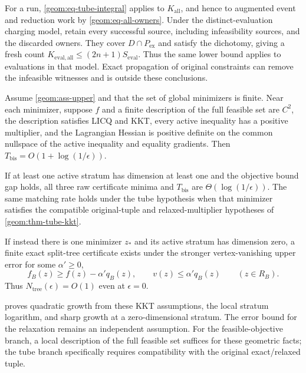 For a run, \cref{geom:eq-tube-integral} applies to $K_{\mathrm{all}}$,
and hence to augmented event and reduction work by
\cref{geom:eq-all-owners}. Under the distinct-evaluation charging model,
retain every successful source, including infeasibility sources, and
the discarded owners. They cover $D\cap P_{\mathrm{ex}}$ and satisfy
the dichotomy, giving a fresh count
$K_{\mathrm{eval,all}}\leq(2n+1)S_{\mathrm{eval}}$.
Thus the same lower bound applies to evaluations in that model.
Exact propagation of original constraints can remove the infeasible
witnesses and is outside these conclusions.

\begin{corollary}\label{geom:cor-kkt-rates}
Assume \cref{geom:ass-upper} and that the set of global minimizers is
finite. Near each minimizer, suppose $f$ and a finite description of the
full feasible set are $C^2$, the description satisfies LICQ and KKT,
every active inequality has
a positive multiplier, and the Lagrangian Hessian is positive definite
on the common nullspace of the active inequality and equality gradients.
Then $T_{\mathrm{bis}}=O(1+\log(1/\epsilon))$.

If at least one active stratum has dimension at least one and the
objective bound gap holds, all three raw certificate minima and
$T_{\mathrm{bis}}$ are $\Theta(\log(1/\epsilon))$. The same matching
rate holds under the tube hypothesis when that minimizer satisfies
the compatible original-tuple and relaxed-multiplier hypotheses of
\cref{geom:thm-tube-kkt}.

If instead there is one minimizer $z_*$ and its active stratum has
dimension zero, a finite exact split-tree certificate exists under the
stronger vertex-vanishing upper error for some $\alpha'\geq0$,
\begin{equation}\label{geom:eq-upper-q}
 f_B(z)\geq f(z)-\alpha' q_B(z),\qquad
                    v(z)\leq\alpha'q_B(z)\qquad(z\in R_B).
\end{equation}
Thus $N_{\mathrm{tree}}(\epsilon)=O(1)$ even at $\epsilon=0$.
\end{corollary}

 proves quadratic growth from these
KKT assumptions, the local stratum logarithm, and sharp growth at a
zero-dimensional stratum. The error bound for the relaxation remains
an independent assumption. For the feasible-objective branch, a local
description of the full feasible set suffices for these geometric facts;
the tube branch specifically requires compatibility with the original
exact/relaxed tuple.

